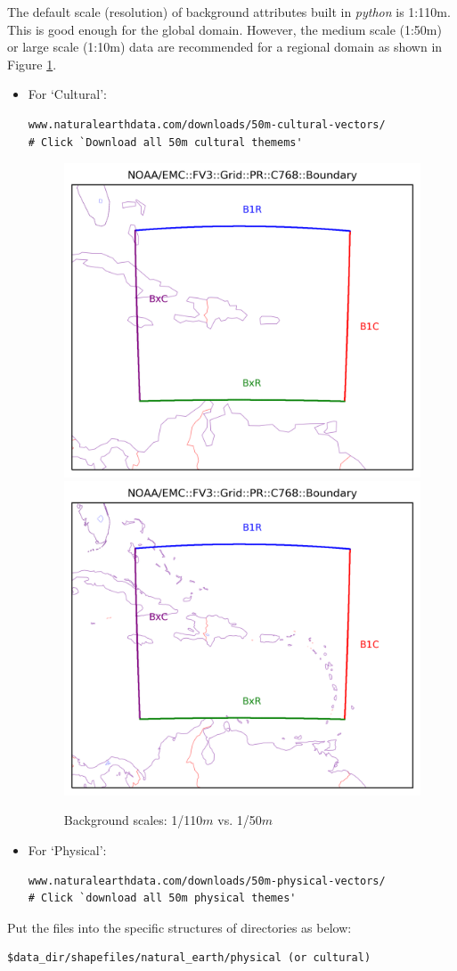 \documentclass[11pt,fleqn]{report}              %
\begin{document}
The default scale (resolution) of background attributes built in {\it python} is 1:110m. This is good enough for the global domain. However, the medium scale (1:50m) or large scale (1:10m) data are recommended for a regional domain as shown in Figure \ref{fig:ne_scale}.
\begin{itemize}
\item For `Cultural':
\lstset{language=bash}   
\begin{lstlisting}[frame=trBL]
www.naturalearthdata.com/downloads/50m-cultural-vectors/
# Click `Download all 50m cultural themems'
\end{lstlisting}

\begin{figure}[ht!]
  \centering
  \includegraphics[width=0.4\linewidth]{fv3_pre_grid_PR_C768_bndr_110m.png}
  \includegraphics[width=0.4\linewidth]{fv3_pre_grid_PR_C768_bndr_50m.png}
  \caption{Background scales: 1/110$m$ vs. 1/50$m$}
  \label{fig:ne_scale}
\end{figure}

\item For `Physical':
\lstset{language=bash}   
\begin{lstlisting}[frame=trBL]
www.naturalearthdata.com/downloads/50m-physical-vectors/
# Click `download all 50m physical themes'
\end{lstlisting}

\end{itemize}  

Put the files into the specific structures of directories as below:
\lstset{language=bash}   
\begin{lstlisting}[frame=trBL]
$data_dir/shapefiles/natural_earth/physical (or cultural)
\end{lstlisting}
\end{document}
